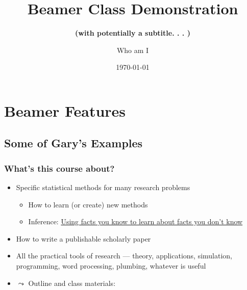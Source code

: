 \documentclass[aspectratio=169,handout]{beamer}
\title[Beamer Demo]{Beamer Class Demonstration}%
\subtitle{\textbf{(with potentially a subtitle. . . )}}
\author{Who am I}
\date{\today}
\institute{IQSS}
\begin{document}
    \frame[plain]{\titlepage}


    \section[Features]{Beamer Features}

    \subsection{Some of Gary's Examples}
    \begin{frame}
        \frametitle{What's this course about?}

        \begin{itemize}
            \item \alert{Specific statistical methods for many research problems}
            \begin{itemize}
                \item How to learn (or create) new methods
                \item Inference: \underline{Using facts you know to learn about
                facts you don't know}
            \end{itemize}
            \item \alert{How to write a publishable scholarly paper}
            \item \alert{All the practical tools of research} --- theory,
            applications, simulation, programming, word processing, plumbing,
            whatever is useful
            \item $\leadsto$ \alert{Outline and class materials:}
        \end{itemize}
    \end{frame}
\end{document}
